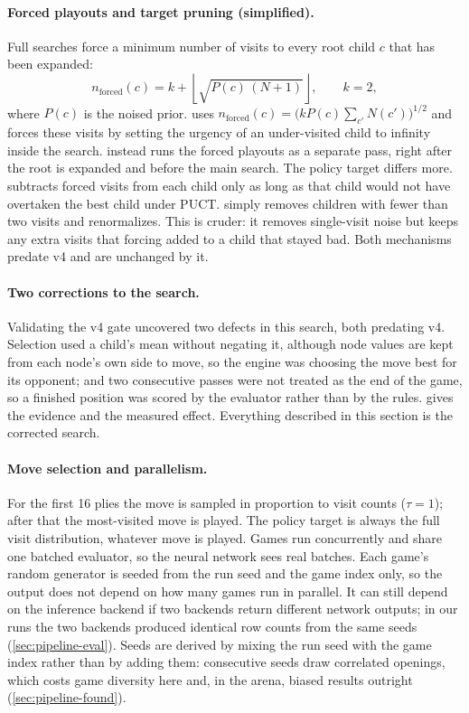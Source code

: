 \paragraph{Forced playouts and target pruning (simplified).}
Full searches force a minimum number of visits to every root child $c$ that has been
expanded:
\begin{equation}
  n_{\mathrm{forced}}(c) = k + \left\lfloor \sqrt{P(c)\,(N+1)} \right\rfloor, \qquad k = 2,
  \label{eq:gofer-forced}
\end{equation}
where $P(c)$ is the noised prior. \katago{} uses
$n_{\mathrm{forced}}(c)=\bigl(kP(c)\sum_{c'}N(c')\bigr)^{1/2}$ and forces these visits by
setting the urgency of an under-visited child to infinity inside the search. \gofer{}
instead runs the forced playouts as a separate pass, right after the root is expanded and
before the main search.
The policy target differs more. \katago{} subtracts forced visits from each child only as
long as that child would not have overtaken the best child under PUCT. \gofer{} simply
removes children with fewer than two visits and renormalizes. This is cruder: it removes
single-visit noise but keeps any extra visits that forcing added to a child that stayed
bad. Both mechanisms predate v4 and are unchanged by it.

\paragraph{Two corrections to the search.}
Validating the v4 gate uncovered two defects in this search, both predating v4.
Selection used a child's mean without negating it, although node values are kept
from each node's own side to move, so the engine was choosing the move best for
its opponent; and two consecutive passes were not treated as the end of the
game, so a finished position was scored by the evaluator rather than by the
rules.  gives the evidence and the measured effect.
Everything described in this section is the corrected search.

\paragraph{Move selection and parallelism.}
For the first 16 plies the move is sampled in proportion to visit counts ($\tau=1$); after
that the most-visited move is played. The policy target is always the full visit
distribution, whatever move is played. Games run concurrently and share one batched
evaluator, so the neural network sees real batches. Each game's random generator is seeded
from the run seed and the game index only, so the output does not depend on how many games
run in parallel. It can still depend on the inference backend if two backends return
different network outputs; in our runs the two backends produced identical row counts
from the same seeds (\cref{sec:pipeline-eval}). Seeds are derived by mixing the run seed
with the game index rather than by adding them: consecutive seeds draw correlated
openings, which costs game diversity here and, in the arena, biased results outright
(\cref{sec:pipeline-found}).

